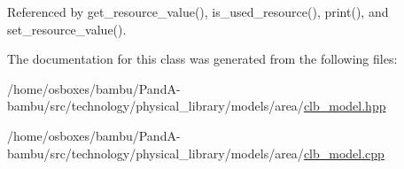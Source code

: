 Referenced by get\+\_\+resource\+\_\+value(), is\+\_\+used\+\_\+resource(), print(), and set\+\_\+resource\+\_\+value().



The documentation for this class was generated from the following files\+:\begin{DoxyCompactItemize}
\item 
/home/osboxes/bambu/\+Pand\+A-\/bambu/src/technology/physical\+\_\+library/models/area/\hyperlink{clb__model_8hpp}{clb\+\_\+model.\+hpp}\item 
/home/osboxes/bambu/\+Pand\+A-\/bambu/src/technology/physical\+\_\+library/models/area/\hyperlink{clb__model_8cpp}{clb\+\_\+model.\+cpp}\end{DoxyCompactItemize}
